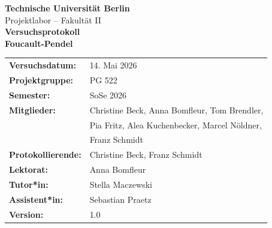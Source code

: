 \documentclass[a4paper,12pt]{article}
\begin{document}

\begin{titlepage}
\begin{center}
{\large\textbf{Technische Universität Berlin}}\\[0.3cm]
{\large Projektlabor -- Fakultät II}\\[2cm]

{\LARGE\textbf{Versuchsprotokoll}}\\[0.5cm]
{\huge\textbf{Foucault-Pendel}}\\[2cm]

\begin{tabular}{ll}
\textbf{Versuchsdatum:} & 14. Mai 2026 \\[0.3cm]
\textbf{Projektgruppe:} & PG 522 \\[0.3cm]
\textbf{Semester:} & SoSe 2026 \\[0.3cm]
\textbf{Mitglieder:} & Christine Beck, Anna Bomfleur, Tom Brendler, \\
& Pia Fritz, Alea Kuchenbecker, Marcel Nöldner, \\
& Franz Schmidt \\[0.3cm]
\textbf{Protokollierende:} & Christine Beck, Franz Schmidt \\[0.3cm]
\textbf{Lektorat:} & Anna Bomfleur \\[0.3cm]
\textbf{Tutor*in:} & Stella Maczewski \\[0.3cm]
\textbf{Assistent*in:} & Sebastian Praetz \\[0.3cm]
\textbf{Version:} & 1.0 \\
\end{tabular}
\end{center}
\end{titlepage}
\end{document}
